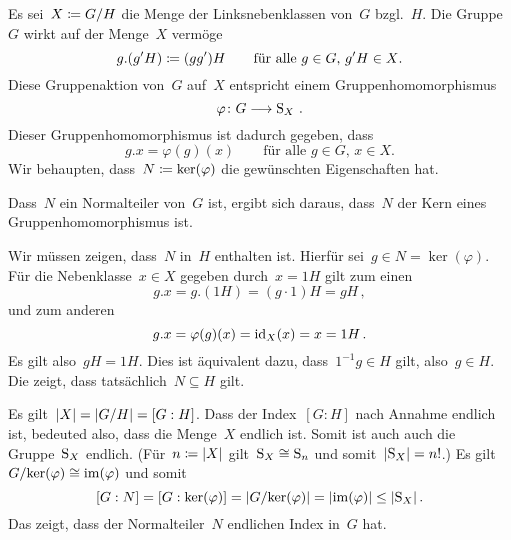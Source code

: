 \documentclass{scrartcl}
\begin{document}
\begin{solution}
  Es sei~$X \coloneqq G/H$ die Menge der Linksnebenklassen von~$G$ bzgl.~$H$.
  Die Gruppe~$G$ wirkt auf der Menge~$X$ vermöge
  \[
    g . (g' H)
    \coloneqq
    (g g') H
    \qquad
    \text{für alle~$g \in G$,~$g'H \in X$.}
  \]
  Diese Gruppenaktion von~$G$ auf~$X$ entspricht einem Gruppenhomomorphismus
  \[
    \varphi
    \colon
    G \to \Sym_X \,.
  \]
  Dieser Gruppenhomomorphismus ist dadurch gegeben, dass
  \[
    g.x = \varphi(g)(x)
    \qquad
    \text{für alle~$g \in G$,~$x \in X$.}
  \]
  Wir behaupten, dass~$N \coloneqq \ker(\varphi)$ die gewünschten Eigenschaften hat.

  Dass~$N$ ein Normalteiler von~$G$ ist, ergibt sich daraus, dass~$N$ der Kern eines Gruppenhomomorphismus ist.

  Wir müssen zeigen, dass~$N$ in~$H$ enthalten ist.
  Hierfür sei~$g \in N = \ker(\varphi)$.
  Für die Nebenklasse~$x \in X$ gegeben durch~$x = 1H$ gilt zum einen
  \[
    g.x
    =
    g . (1H)
    =
    (g \cdot 1) H
    =
    gH \,,
  \]
  und zum anderen
  \[
    g.x
    =
    \varphi(g)(x)
    =
    \mathrm{id}_X(x)
    =
    x
    =
    1H \,.
  \]
  Es gilt also~$gH = 1H$.
  Dies ist äquivalent dazu, dass~$1^{-1} g \in H$ gilt, also~$g \in H$.
  Die zeigt, dass tatsächlich~$N \subseteq H$ gilt.

  Es gilt~$\lvert X\rvert = \lvert G/H\rvert = [G : H]$.
  Dass der Index~$[G : H]$ nach Annahme endlich ist, bedeuted also, dass die Menge~$X$ endlich ist.
  Somit ist auch auch die Gruppe~$\operatorname{S}_X$ endlich.
  (Für~$n \coloneqq \lvert X\rvert$ gilt~$\operatorname{S}_X \cong \operatorname{S}_n$ und somit~$\lvert \operatorname{S}_X \rvert = n!$.)
  Es gilt~$G / {\ker(\varphi)} \cong \operatorname{im}(\varphi)$ und somit
  \[
    [G : N]
    =
    [G : \ker(\varphi)]
    =
    \lvert G / {\ker(\varphi)} \rvert
    =
    \lvert \operatorname{im}(\varphi) \rvert
    \leq
    \lvert \operatorname{S}_X \rvert \,.
  \]
  Das zeigt, dass der Normalteiler~$N$ endlichen Index in~$G$ hat.
\end{solution}






\printsolutions
\end{document}
